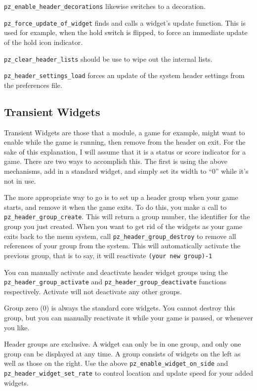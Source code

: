 \documentclass[12pt,letterpaper]{report}
\begin{document}
\verb|pz_enable_header_decorations| likewise switches to a decoration.

\verb|pz_force_update_of_widget| finds and calls a widget's update
function.  This is used for example, when the hold switch is flipped,
to force an immediate update of the hold icon indicator.

\verb|pz_clear_header_lists| should be use to wipe out the internal lists.

\verb|pz_header_settings_load| forces an update of the system header settings from the preferences file.


\subsection{Transient Widgets}

Transient Widgets are those that a module, a game for example, might
want to enable while the game is running, then remove from the
header on exit.  For the sake of this explanation, I will assume
that it is a status or score indicator for a game. There are two
ways to accomplish this.  The first is using the above mechanisms,
add in a standard widget, and simply set its width to ``0'' while
it's not in use.  

The more appropriate way to go is to set up a header group when
your game starts, and remove it when the game exits.  To do this,
you make a call to \verb|pz_header_group_create|.  This will return
a group number, the identifier for the group you just created.  When
you want to get rid of the widgets as your game exits back to the
menu system, call \verb|pz_header_group_destroy| to remove all
references of your group from the system.  This will automatically
activate the previous group, that is to say, it will reactivate
\verb|(your new group)-1|

You can manually activate and deactivate header widget groups using
the \verb|pz_header_group_activate| and \verb|pz_header_group_deactivate|
functions respectively.  Activate will not deactivate any other groups.

Group zero (0) is always the standard core widgets.  You cannot
destroy this group, but you can manually reactivate it while your
game is paused, or whenever you like.

Header groups are exclusive.  A widget can only be in one group, and
only one group can be displayed at any time.  A group consists of 
widgets on the left as well as those on the right.  Use the above 
\verb|pz_enable_widget_on_side| and \verb|pz_header_widget_set_rate| to
control location and update speed for your added widgets.
\end{document}
